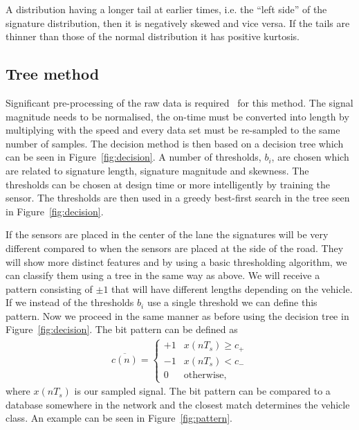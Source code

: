 A distribution having a longer tail at earlier times, i.e. the ``left side'' of the signature distribution, then it is negatively skewed and vice versa. If the tails are thinner than those of the normal distribution it has positive kurtosis.

\subsection{Tree method}
Significant pre-processing of the raw data is required~\cite{cheung2005-2} for this method. The signal magnitude needs to be normalised, the on-time must be converted into length by multiplying with the speed and every data set must be re-sampled to the same number of samples. The decision method is then based on a decision tree which can be seen in Figure~\ref{fig:decision}. A number of thresholds, $b_i$, are chosen which are related to signature length, signature magnitude and skewness. The thresholds can be chosen at design time or more intelligently by training the sensor. The thresholds are then used in a greedy best-first search in the tree seen in Figure~\ref{fig:decision}.

If the sensors are placed in the center of the lane the signatures will be very different compared to when the sensors are placed at the side of the road. They will show more distinct features and by using a basic thresholding algorithm, we can classify them using a tree in the same way as above. We will receive a pattern consisting of ${\pm 1}$ that will have different lengths depending on the vehicle. If we instead of the thresholds $b_i$ use a single threshold we can define this pattern. Now we proceed in the same manner as before using the decision tree in Figure~\ref{fig:decision}. The bit pattern can be defined as
\begin{align}
 \overline{c(n)} = \left\{\begin{array}{cl}
+1 & x(nT_s) \geq c_+\\
- 1 & x(nT_s) < c_-\\
0 & \text{otherwise},  
\end{array}\right.
\end{align}
where $x(nT_s)$ is our sampled signal. The bit pattern can be compared to a database somewhere in the network and the closest match determines the vehicle class. An example can be seen in \mbox{Figure~\ref{fig:pattern}.}

